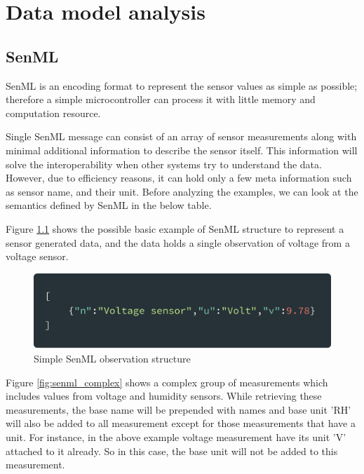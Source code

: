

	\let\cleardoublepage\clearpage
    \chapter{Data model analysis}
    \section{SenML}
    SenML is an encoding format to represent the sensor values as simple as possible; therefore a simple microcontroller can process it with little memory and computation resource.
    
    Single SenML message can consist of an array of sensor measurements along with minimal additional information to describe the sensor itself. This information will solve the interoperability when other systems try to understand the data. However, due to efficiency reasons, it can hold only a few meta information such as sensor name, and their unit. Before analyzing the examples, we can look at the semantics defined by SenML in the below table.
    
     Figure \ref{fig:senml_simple} shows the possible basic example of SenML structure to represent a sensor generated data, and the data holds a single observation of voltage from a voltage sensor.
    
    \begin{figure}[!htbp] 
    	\begin{center}
    		\includegraphics[scale=0.1]{./images/png/senml/simple}	
    		\caption{Simple SenML observation structure}	
    		\label{fig:senml_simple}	
    	\end{center}
    \end{figure}

       
    
    
    Figure \ref{fig:senml_complex} shows a complex group of measurements which includes values from voltage and humidity sensors. While retrieving these measurements, the base name will be prepended with names and base unit 'RH' will also be added to all measurement except for those measurements that have a unit. For instance, in the above example voltage measurement have its unit 'V' attached to it already. So in this case, the base unit will not be added to this measurement.
    
